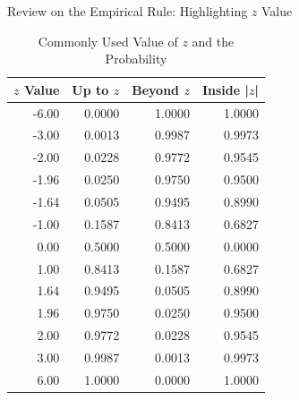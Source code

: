 \documentclass{beamer}
\begin{document}
\begin{frame}{Review on the Empirical Rule: Highlighting $z$ Value}

\begin{multicols}{2}

\begin{scriptsize}
\begin{center}
\begin{table}[]
\caption{Commonly Used Value of $z$ and the Probability}
\begin{tabular}{r|r|r|r}
\hline
$z$ Value     & Up to $z$ & Beyond $z$ & Inside |$z$| \\ \hline
-6.00 & 0.0000  & 1.0000   & 1.0000     \\ \hline
-3.00 & 0.0013  & 0.9987   & 0.9973     \\ \hline
-2.00 & 0.0228  & 0.9772   & 0.9545     \\ \hline
-1.96 & 0.0250  & 0.9750   & 0.9500     \\ \hline
-1.64 & 0.0505  & 0.9495   & 0.8990     \\ \hline
-1.00 & 0.1587  & 0.8413   & 0.6827     \\ \hline
0.00  & 0.5000  & 0.5000   & 0.0000     \\ \hline
1.00  & 0.8413  & 0.1587   & 0.6827     \\ \hline
1.64  & 0.9495  & 0.0505   & 0.8990     \\ \hline
1.96  & 0.9750  & 0.0250   & 0.9500     \\ \hline
2.00  & 0.9772  & 0.0228   & 0.9545     \\ \hline
3.00  & 0.9987  & 0.0013   & 0.9973     \\ \hline
6.00  & 1.0000  & 0.0000   & 1.0000     \\ \hline
\end{tabular}
\end{table}

\end{center}
\end{scriptsize}


\end{multicols}
\end{frame}
\end{document}
